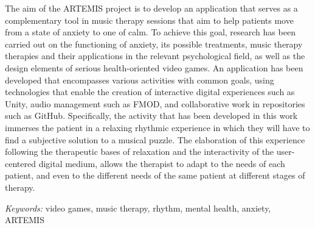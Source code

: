 The aim of the ARTEMIS project is to develop an application that serves as a complementary tool in music therapy sessions that aim to help patients move from a state of anxiety to one of calm. To achieve this goal, research has been carried out on the functioning of anxiety, its possible treatments, music therapy therapies and their applications in the relevant psychological field, as well as the design elements of serious health-oriented video games. An application has been developed that encompasses various activities with common goals, using technologies that enable the creation of interactive digital experiences such as Unity, audio management such as FMOD, and collaborative work in repositories such as GitHub. Specifically, the activity that has been developed in this work immerses the patient in a relaxing rhythmic experience in which they will have to find a subjective solution to a musical puzzle. The elaboration of this experience following the therapeutic bases of relaxation and the interactivity of the user-centered digital medium, allows the therapist to adapt to the needs of each patient, and even to the different needs of the same patient at different stages of therapy.

\textit{Keywords:} video games, music therapy, rhythm, mental health, anxiety, ARTEMIS